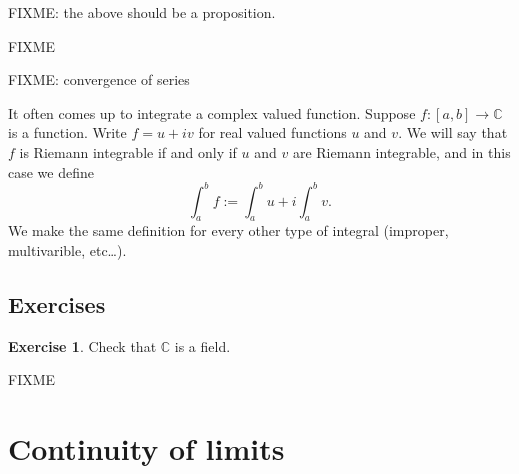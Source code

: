\documentclass[12pt]{book}
\newcommand{\C}{{\mathbb{C}}}
\newcommand{\myindex}[1]{#1\index{#1}}
\newcommand{\sectionnewpage}{\clearpage}
\theoremstyle{plain}
\theoremstyle{remark}
\theoremstyle{definition}
\theoremstyle{exercise}
\newtheorem{exercise}{Exercise}[section]
\theoremstyle{example}
\begin{document}
FIXME: the above should be a proposition.



FIXME

FIXME: convergence of series

It often comes up to integrate a complex valued function.  Suppose
$f \colon [a,b] \to \C$ is a function.  Write
$f = u+iv$ for real valued functions $u$ and $v$.  We will say
that $f$ is Riemann integrable if and only if $u$ and $v$ are Riemann
integrable, and in this case we define
\begin{equation*}
\int_a^b f := \int_a^b u + i \int_a^b v .
\end{equation*}
We make the same definition for every other type of integral (improper,
multivarible, etc\ldots).

\subsection{Exercises}

\begin{exercise}
Check that $\C$ is a field.
\end{exercise}

FIXME



\sectionnewpage
\section{Continuity of limits}
\label{sec:FIXME}
\end{document}

